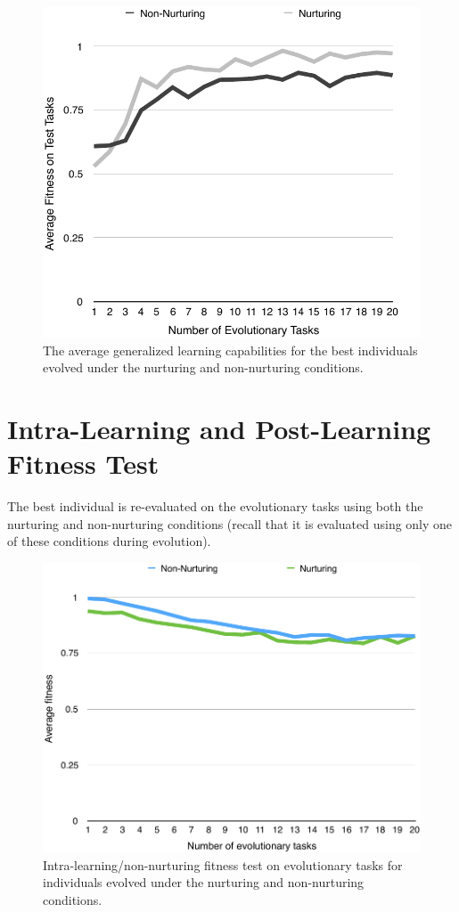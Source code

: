 \documentclass[master]{outhesis}
\begin{document}
\begin{figure}[H]
	\centering
	\includegraphics{ChalmersLearningTest.pdf}
	\caption{The average generalized learning capabilities for the best individuals evolved under the nurturing and non-nurturing conditions.}
	\label{fig:ChalmersLearningTest}
\end{figure}

\section{Intra-Learning and Post-Learning Fitness Test}

The best individual is re-evaluated on the evolutionary tasks using both the nurturing and non-nurturing conditions (recall that it is evaluated using only one of these conditions during evolution).

\begin{figure}[H]
	\centering
	\includegraphics{NonNurturingFitnessTestPlot.pdf}
	\caption{Intra-learning/non-nurturing fitness test on evolutionary tasks for individuals evolved under the nurturing and non-nurturing conditions.}
\end{figure}
\end{document}
